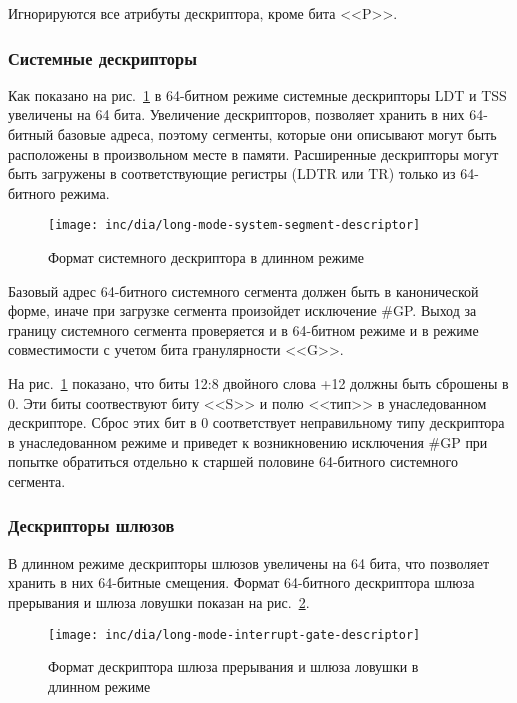 Игнорируются все атрибуты дескриптора, кроме бита <<P>>.

\subsubsection*{Системные дескрипторы}
\label{subsec:system_desriptor_format}

Как показано на рис.~\ref{fig:long-mode-system-segment-descriptor-format} в 64-битном режиме
системные дескрипторы LDT и TSS увеличены на 64 бита. Увеличение дескрипторов, позволяет
хранить в них 64-битный базовые адреса, поэтому сегменты, которые они описывают могут быть
расположены в произвольном месте в памяти. Расширенные дескрипторы могут быть загружены в
соответствующие регистры (LDTR или TR) только из 64-битного режима.

\begin{figure}[ht!]
  \centering
  \texttt{[image: inc/dia/long-mode-system-segment-descriptor]}
  \caption{Формат системного дескриптора в длинном режиме}
  \label{fig:long-mode-system-segment-descriptor-format}
\end{figure}

Базовый адрес 64-битного системного сегмента должен быть в канонической форме, иначе при
загрузке сегмента произойдет исключение \#GP. Выход за границу системного сегмента проверяется и
в 64-битном режиме и в режиме совместимости с учетом бита гранулярности <<G>>.

На рис.~\ref{fig:long-mode-system-segment-descriptor-format} показано, что биты 12:8 двойного слова +12
должны быть сброшены в 0. Эти биты соотвествуют биту <<S>> и полю <<тип>> в унаследованном дескрипторе.
Сброс этих бит в 0 соответствует неправильному типу дескриптора в унаследованном режиме и приведет
к возникновению исключения \#GP при попытке обратиться отдельно к старшей половине 64-битного системного сегмента.

\subsubsection*{Дескрипторы шлюзов}
В длинном режиме дескрипторы шлюзов увеличены на 64 бита, что позволяет хранить в них 64-битные смещения.
Формат 64-битного дескриптора шлюза прерывания и шлюза ловушки показан на рис.~\ref{fig:long-mode-interrupt-gate-descriptor}.

\begin{figure}[ht!]
  \centering
  \texttt{[image: inc/dia/long-mode-interrupt-gate-descriptor]}
  \caption{Формат дескриптора шлюза прерывания и шлюза ловушки в длинном режиме}
  \label{fig:long-mode-interrupt-gate-descriptor}
\end{figure}

